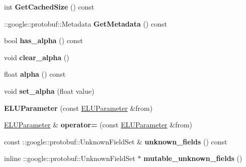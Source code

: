 \begin{DoxyCompactItemize}
int {\bfseries Get\+Cached\+Size} () const
\item 
\mbox{\label{classcaffe_1_1_e_l_u_parameter_a1bca7dd93288ec8258c3df23ee586fb6}} 
\+::google\+::protobuf\+::\+Metadata {\bfseries Get\+Metadata} () const
\item 
\mbox{\label{classcaffe_1_1_e_l_u_parameter_a31224a3109da33615df9787e525938cc}} 
bool {\bfseries has\+\_\+alpha} () const
\item 
\mbox{\label{classcaffe_1_1_e_l_u_parameter_a3dc6959363cb36881656ce22c396a373}} 
void {\bfseries clear\+\_\+alpha} ()
\item 
\mbox{\label{classcaffe_1_1_e_l_u_parameter_abfd2c5421b603591e4fec3355423771c}} 
float {\bfseries alpha} () const
\item 
\mbox{\label{classcaffe_1_1_e_l_u_parameter_a9b8ab7bf52e24e40528c99baab954ba6}} 
void {\bfseries set\+\_\+alpha} (float value)
\item 
\mbox{\label{classcaffe_1_1_e_l_u_parameter_aa519ec0e7db984294bd76d7232a3bfca}} 
{\bfseries E\+L\+U\+Parameter} (const \mbox{\hyperlink{classcaffe_1_1_e_l_u_parameter}{E\+L\+U\+Parameter}} \&from)
\item 
\mbox{\label{classcaffe_1_1_e_l_u_parameter_aa10b63e625eb1d5b6eccdf4162b6a163}} 
\mbox{\hyperlink{classcaffe_1_1_e_l_u_parameter}{E\+L\+U\+Parameter}} \& {\bfseries operator=} (const \mbox{\hyperlink{classcaffe_1_1_e_l_u_parameter}{E\+L\+U\+Parameter}} \&from)
\item 
\mbox{\label{classcaffe_1_1_e_l_u_parameter_aab6e2513bf8ed9450e106304cf7779df}} 
const \+::google\+::protobuf\+::\+Unknown\+Field\+Set \& {\bfseries unknown\+\_\+fields} () const
\item 
\mbox{\label{classcaffe_1_1_e_l_u_parameter_a6d7184752157cc7bcc9ad74d897ad41a}} 
inline \+::google\+::protobuf\+::\+Unknown\+Field\+Set $\ast$ {\bfseries mutable\+\_\+unknown\+\_\+fields} ()

\end{DoxyCompactItemize}
